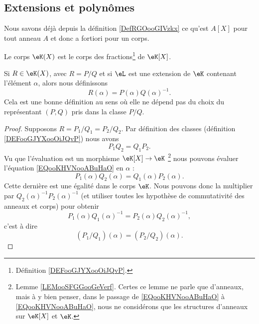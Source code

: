 \subsection{Extensions et polynômes}

Nous savons déjà depuis la définition \ref{DefRGOooGIVzkx} ce qu'est \( A[X]\) pour tout anneau \( A\) et donc a fortiori pour un corps.

\begin{definition}  \label{DEFooHUWWooHiuRBr}
    Le corps \( \eK(X)\) est le corps des fractions\footnote{Définition \ref{DEFooGJYXooOiJQvP}.} de \( \eK[X]\).
\end{definition}


\begin{lemmaDef}        \label{DEFooZHBZooKlNfGZ}
    Si \( R\in \eK(X)\), avec \( R=P/Q\) et si \( \eL\) est une extension de \( \eK\) contenant l'élément \( \alpha\), alors nous définissons  
    \begin{equation}
        R(\alpha)=P(\alpha)Q(\alpha)^{-1}.
    \end{equation}
    Cela est une bonne définition au sens où elle ne dépend pas du choix du représentant \( (P,Q)\) pris dans la classe \( P/Q\).
\end{lemmaDef}

\begin{proof}
    Supposons \( R=P_1/Q_1=P_2/Q_2\). Par définition des classes (définition \ref{DEFooGJYXooOiJQvP}) nous avons
    \begin{equation}        \label{EQooKHVNooABuHaO}
        P_1Q_2=Q_1P_2.
    \end{equation}
    Vu que l'évaluation est un morphisme \( \eK[X]\to\eK\) \footnote{Lemme \ref{LEMooSFGGooGeVerf}. Certes ce lemme ne parle que d'anneaux, mais à y bien penser, dans le passage de \eqref{EQooKHVNooABuHaO} à \eqref{EQooKHVNooABuHaO}, nous ne considérons que les structures d'anneaux sur \( \eK[X]\) et \( \eK\).} nous pouvons évaluer l'équation \eqref{EQooKHVNooABuHaO} en \( \alpha\) :
    \begin{equation}        \label{EQooJAIGooRADgiD}
        P_1(\alpha)Q_2(\alpha)=Q_1(\alpha)P_2(\alpha).
    \end{equation}
    Cette dernière est une égalité dans le corps \( \eK\). Nous pouvons donc la multiplier par \( Q_2(\alpha)^{-1}P_2(\alpha)^{-1}\) (et utiliser toutes les hypothèse de commutativité des anneaux et corps) pour obtenir
    \begin{equation}
        P_1(\alpha)Q_1(\alpha)^{-1}=P_2(\alpha)Q_2(\alpha)^{-1},
    \end{equation}
    c'est à dire
    \begin{equation}
        (P_1/Q_1)(\alpha)=(P_2/Q_2)(\alpha).
    \end{equation}
\end{proof}

